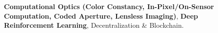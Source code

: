 \textbf{Computational Optics (Color Constancy, In-Pixel/On-Sensor Computation, Coded Aperture, Lensless Imaging)}, \textbf{Deep Reinforcement Learning}, Decentralization \& Blockchain.